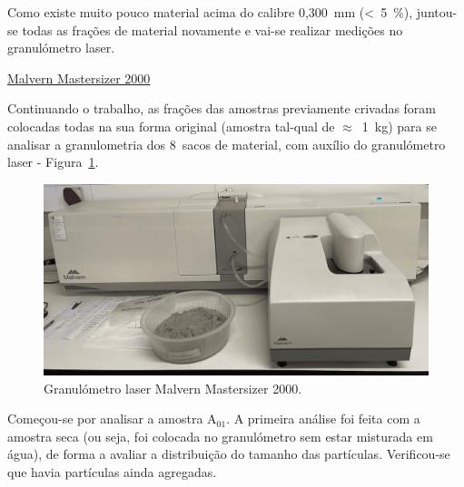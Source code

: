 Como existe muito pouco material acima do calibre 0,300~mm (<~5~\%), juntou-se todas as frações de material novamente e vai-se realizar medições no granulómetro laser.

\hrulefill
\pagebreak



 \href{https://www.malvernpanalytical.com/en/support/product-support/mastersizer-range/mastersizer-2000}{Malvern Mastersizer 2000}


Continuando o trabalho, as frações das amostras previamente crivadas foram colocadas todas na sua forma original (amostra tal-qual de $\approx$~1~kg) para se analisar a granulometria dos 8~sacos de material, com auxílio do granulómetro laser - Figura~\ref{fig:granulometro_laser}.

\begin{figure}[!htb]
    \centering
    \includegraphics[width=0.75\linewidth]{figures/granulometro_laser}
    \caption{Granulómetro laser Malvern Mastersizer 2000.}
    \label{fig:granulometro_laser}
\end{figure}

Começou-se por analisar a amostra A$_{01}$.
A primeira análise foi feita com a amostra seca (ou seja, foi colocada no granulómetro sem estar misturada em água), de forma a avaliar a distribuição do tamanho das partículas.
Verificou-se que havia partículas ainda agregadas.

